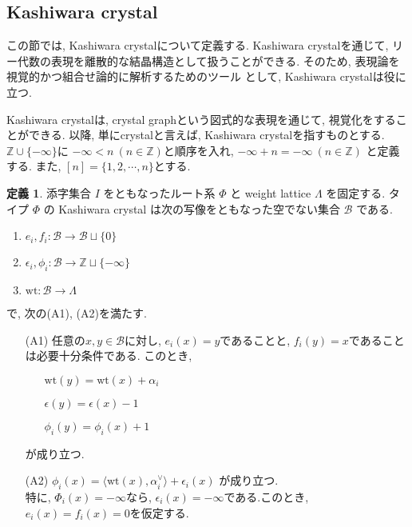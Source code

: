 \documentclass[
  a4paper, 
  12pt,
  ja=standard,
  xelatex,
  left=30truemm,
  right=30truemm,
  titlepage 
]{bxjsarticle}
\theoremstyle{definition}
\newtheorem{df}{定義}
\begin{document}
%
\subsection{Kashiwara crystal}
この節では, Kashiwara crystalについて定義する. Kashiwara crystalを通じて, リー代数の表現を離散的な結晶構造として扱うことができる. そのため, 表現論を視覚的かつ組合せ論的に解析するためのツール
として, Kashiwara crystalは役に立つ. 

Kashiwara crystalは, crystal graphという図式的な表現を通じて, 視覚化をすることができる. 以降, 単にcrystalと言えば, Kashiwara crystalを指すものとする.
\\

$\mathbb{Z} \cup \{ - \infty \} $に $- \infty < n \ ( n \in \mathbb{Z} ) $と順序を入れ, $ - \infty + n = - \infty \ ( n \in \mathbb{Z} ) $
と定義する. また, $ [n] = \{ 1, 2, \cdots , n \} $とする.

\begin{df}
  添字集合 $I$ をともなったルート系 $\Phi$ と weight lattice $\Lambda$ を固定する.
  タイプ $\Phi$ の Kashiwara crystal は次の写像をともなった空でない集合 $\mathscr{B}$ である.
  \begin{enumerate}
    \item $e_i, f_i : \mathscr{B} \to \mathscr{B} \sqcup \{ 0 \}$
    \item $\epsilon_i, \phi_i : \mathscr{B} \to \mathbb{Z} \sqcup \{ - \infty \}$
    \item $\mathrm{wt} : \mathscr{B} \to \Lambda$
  \end{enumerate}
  で, 次の(A1), (A2)を満たす.
  \begin{enumerate}
    \item [(A1)] 任意の$x, y \in \mathscr{B}$に対し, $e_i(x) = y $であることと, $f_i(y) = x $であることは必要十分条件である.
    このとき, 
    \begin{enumerate}
      \item [] $\mathrm{wt}(y) = \mathrm{wt}(x) + \alpha_i$
      \item [] $\epsilon(y) = \epsilon(x) - 1$
      \item [] $\phi_i(y) = \phi_i(x) + 1 $
    \end{enumerate}
    が成り立つ.
    \item [(A2)] $\phi_i(x) = \langle \mathrm{wt}(x), \alpha_i ^{ \vee } \rangle + \epsilon_i(x) $
    が成り立つ.\\
    特に, $\Phi_i(x) = - \infty$なら, $\epsilon_i(x) = - \infty $である.このとき, $e_i(x) = f_i(x) = 0$を仮定する.
  \end{enumerate}
\end{df}
\end{document}
